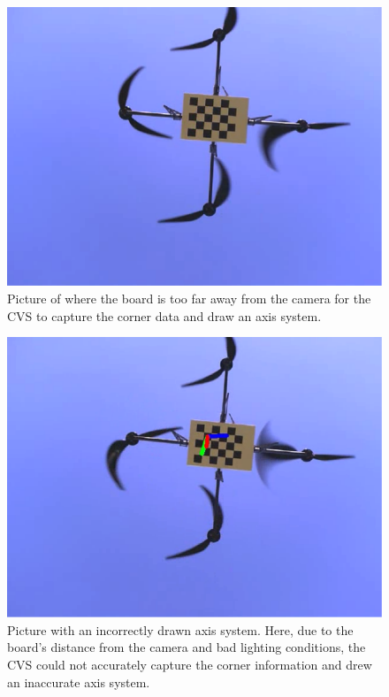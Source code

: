 \begin{figure}
  \centering
  \includegraphics[width=\textwidth]{figures/appendices/oov4}
  \caption{Picture of where the board is too far away from the camera for the CVS to capture the corner data and draw an axis system.}
\end{figure}

\begin{figure}
  \centering
  \includegraphics[width=\textwidth]{figures/appendices/oov7}
  \caption[Picture with an incorrectly drawn axis system.]{Picture with an incorrectly drawn axis system. Here, due to the board's distance from the camera and bad lighting conditions, the CVS could not accurately capture the corner information and drew an inaccurate axis system.}
\end{figure}

\endinput
